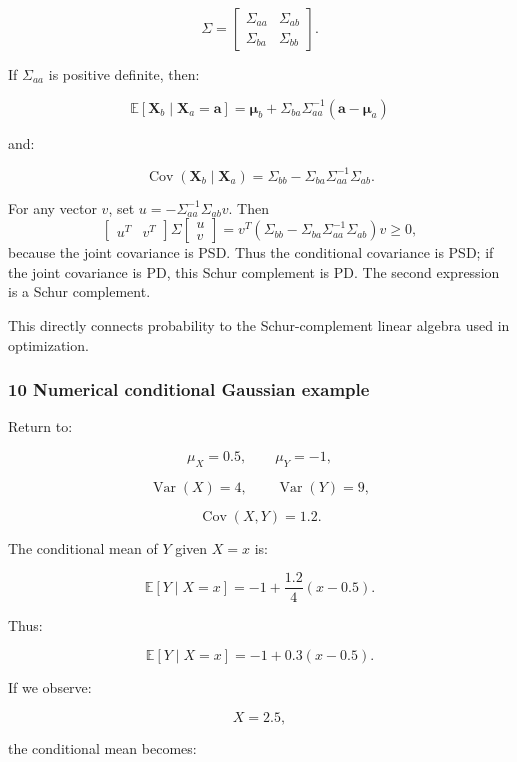 \[
 \Sigma= \begin{bmatrix} \Sigma_{aa}&\Sigma_{ab}\\ \Sigma_{ba}&\Sigma_{bb} \end{bmatrix}.
\]

If \(\Sigma_{aa}\) is positive definite, then:

\[
 \boxed{ \mathbb E[\mathbf X_b\mid\mathbf X_a=\mathbf a] = \boldsymbol\mu_b+ \Sigma_{ba}\Sigma_{aa}^{-1} (\mathbf a-\boldsymbol\mu_a) }
\]

and:

\[
 \boxed{ \operatorname{Cov}(\mathbf X_b\mid\mathbf X_a) = \Sigma_{bb} - \Sigma_{ba}\Sigma_{aa}^{-1}\Sigma_{ab} }.
\]

For any vector \(v\), set \(u=-\Sigma_{aa}^{-1}\Sigma_{ab}v\). Then \[
\begin{bmatrix}u^T&v^T\end{bmatrix}
\Sigma
\begin{bmatrix}u\\v\end{bmatrix}
=
v^T\left(\Sigma_{bb}-\Sigma_{ba}\Sigma_{aa}^{-1}\Sigma_{ab}\right)v
\ge 0,
\] because the joint covariance is PSD. Thus the conditional covariance is PSD; if the joint covariance is PD, this Schur complement is PD. The second expression is a Schur complement.

This directly connects probability to the Schur-complement linear algebra used in optimization.

\subsubsection{10 Numerical conditional Gaussian example}\label{02-foundations-ii-ch024-numerical-conditional-gaussian-example}

Return to:

\[
 \mu_X=0.5,\qquad \mu_Y=-1,
\]

\[
 \operatorname{Var}(X)=4,\qquad \operatorname{Var}(Y)=9,
\]

\[
 \operatorname{Cov}(X,Y)=1.2.
\]

The conditional mean of \(Y\) given \(X=x\) is:

\[
 \mathbb E[Y\mid X=x] = -1+\frac{1.2}{4}(x-0.5).
\]

Thus:

\[
 \boxed{ \mathbb E[Y\mid X=x] = -1+0.3(x-0.5) }.
\]

If we observe:

\[
 X=2.5,
\]

the conditional mean becomes:

